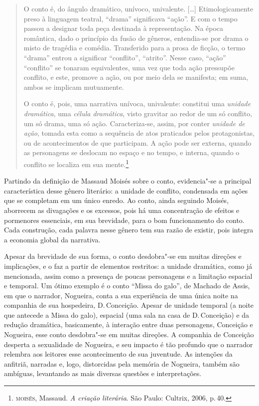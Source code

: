 \documentclass[11pt]{extarticle}
\begin{document}
\begin{quote}
O conto é, do ângulo dramático, unívoco, univalente. [\ldots]
Etimologicamente preso à linguagem teatral,
``drama'' significava ``ação''. E com o tempo passou a designar
toda peça destinada à representação. Na época romântica, dado o
princípio da fusão de gêneros, entendia-se por drama o misto de
tragédia e comédia. Transferido para a prosa de ficção, o termo
``drama'' entrou a significar ``conflito'', ``atrito''. Nesse caso,
``ação'' ``conflito'' se tonaram equivalentes, uma vez que toda
ação pressupõe conflito, e este, promove a ação, ou por meio dela
se manifesta; em suma, ambos se implicam mutuamente.

O conto é, pois, uma narrativa unívoca, univalente: constitui
uma \textit{unidade dramática}, uma \textit{célula dramática}, visto gravitar ao
redor de um só conflito, um só drama, uma só ação. Caracteriza-se,
assim, por conter \textit{unidade de ação}, tomada esta como a sequência de atos praticados pelos protagonistas, ou de acontecimentos de
que participam. A ação pode ser externa, quando as personagens se
deslocam no espaço e no tempo, e interna, quando o conflito se
localiza em sua mente.\footnote{\textsc{moisés}, Massaud. \textit{A criação literária}. São Paulo: Cultrix, 2006, p.\,40.}
\end{quote}

Partindo da definição de Massaud Moisés sobre o conto, evidencia"-se a principal característica desse gênero literário: a unidade de conflito, condensada em ações que se completam em um único enredo. Ao conto, ainda seguindo Moisés, aborrecem as divagações e os excessos, pois há uma concentração de efeitos e pormenores essenciais, em sua brevidade, para o bom funcionamento do conto.
Cada construção, cada palavra nesse gênero tem sua razão de existir, pois integra a economia global da narrativa.

Apesar da brevidade de sua forma, o conto desdobra"-se em muitas direções e implicações, e o faz a partir de elementos restritos: a unidade dramática, como já mencionada, assim como a presença de poucas personagens e a limitação espacial e temporal. Um ótimo exemplo é o conto ``Missa do galo'', de Machado de Assis, em que o narrador, Nogueira, conta a sua experiência de uma única noite na companhia de sua hospedeira, D.\,Conceição. Apesar de unidade temporal (a noite que antecede a Missa do galo), espacial (uma sala na casa de D.\,Conceição) e da redução dramática, basicamente, à interação entre duas personagens, Conceição e Nogueira, esse conto desdobra"-se em muitas direções. A companhia de Conceição desperta a sexualidade de Nogueira, e seu impacto é tão profundo que o narrador relembra aos leitores esse acontecimento de sua juventude. As intenções da anfitriã, narradas e, logo, distorcidas pela memória de Nogueira, também são ambíguas, levantando as mais diversas questões e interpretações.
\end{document}
